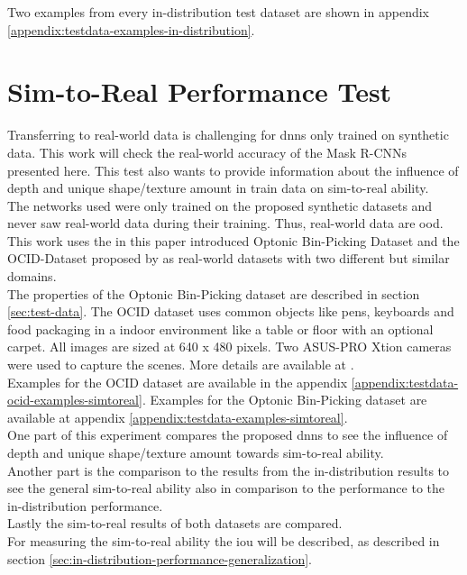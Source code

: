 		Two examples from every in-distribution test dataset are shown in appendix \ref{appendix:testdata-examples-in-distribution}.
	
	
	
	\section{Sim-to-Real Performance Test}
	\label{sec:simt-to-real-performance-test}
		Transferring to real-world data is challenging for \ac{dnn}s only trained on synthetic data. This work will check the real-world accuracy of the Mask R-CNNs presented here. This test also wants to provide information about the influence of depth and unique shape/texture amount in train data on sim-to-real ability.\\
		The networks used were only trained on the proposed synthetic datasets and never saw real-world data during their training. Thus, real-world data are \acl{ood}. This work uses the in this paper introduced Optonic Bin-Picking Dataset and the OCID-Dataset proposed by \citeauthor{Suchi2019} as real-world datasets with two different but similar domains. \\
		The properties of the Optonic Bin-Picking dataset are described in section \ref{sec:test-data}. The OCID dataset uses common objects like pens, keyboards and food packaging in a indoor environment like a table or floor with an optional carpet. All images are sized at 640 x 480 pixels. Two ASUS-PRO Xtion cameras were used to capture the scenes. More details are available at .\\
		Examples for the OCID dataset are available in the appendix \ref{appendix:testdata-ocid-examples-simtoreal}. Examples for the Optonic Bin-Picking dataset are available at appendix \ref{appendix:testdata-examples-simtoreal}.
		\\
		One part of this experiment compares the proposed \ac{dnn}s to see the influence of depth and unique shape/texture amount towards sim-to-real ability.\\
		Another part is the comparison to the results from the in-distribution results to see the general sim-to-real ability also in comparison to the performance to the in-distribution performance.\\
		Lastly the sim-to-real results of both datasets are compared.\\
		For measuring the sim-to-real ability the \ac{iou} will be described, as described in section \ref{sec:in-distribution-performance-generalization}.
	
	
	
	
	
	
	
	
	


